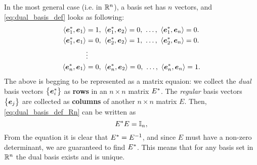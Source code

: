 In the most general case (i.e. in $\Rs[n]$), a basis set has $n$ vectors, and \autoref{eq:dual_basis_def} looks as following:
\begin{equation}
    \begin{aligned}
        \inner{\dualeb{1}}{\eb{1}} &= 1,\ \inner{\dualeb{1}}{\eb{2}} = 0,\ \dots,\ \inner{\dualeb{1}}{\eb{n}} = 0.\\
        \inner{\dualeb{1}}{\eb{1}} &= 0,\ \inner{\dualeb{2}}{\eb{2}} = 1,\ \dots,\ \inner{\dualeb{2}}{\eb{n}} = 0.\\
                                   &\vdots\\
        \inner{\dualeb{n}}{\eb{1}} &= 0,\ \inner{\dualeb{n}}{\eb{2}} = 0,\ \dots,\ \inner{\dualeb{n}}{\eb{n}} = 1.\\
    \end{aligned}
    \label{eq:dual_basis_def_Rn}
\end{equation}
The above is begging to be represented as a matrix equaion: we collect the \textit{dual} basis vectors $\left\{\dualeb{i}\right\}$ as \textbf{rows} in an $n\times n$ matrix $\dualbasis{E}$. The \textit{regular} basis vectors $\left\{\eb{j}\right\}$ are collected as \textbf{columns} of another $n\times n$ matrix $E$. Then, \autoref{eq:dual_basis_def_Rn} can be written as
\begin{equation}
    \dualbasis{E}E = \Id{n},
    \label{eq:dual_basis_matrix}
\end{equation}
From the equation it is clear that $\dualbasis{E}=E^{-1}$, and since $E$ must have a non-zero determinant, we are guaranteed to find $\dualbasis{E}$. This means that for any basis set in $\Rs[n]$ the dual basis exists and is unique.

